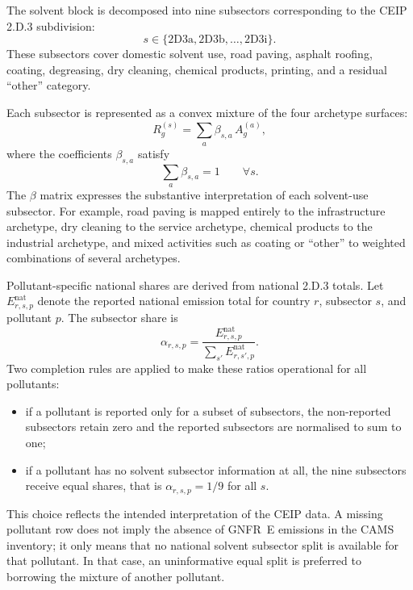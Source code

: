 The solvent block is decomposed into nine subsectors corresponding to
the CEIP 2.D.3 subdivision:
\begin{equation}
  s \in \{
  \mathrm{2D3a},\mathrm{2D3b},\ldots,\mathrm{2D3i}
  \}.
\end{equation}
These subsectors cover domestic solvent use, road paving, asphalt
roofing, coating, degreasing, dry cleaning, chemical products,
printing, and a residual ``other'' category.

Each subsector is represented as a convex mixture of the four archetype
surfaces:
\begin{equation}
  R_g^{(s)} =
  \sum_{a}
  \beta_{s,a} \, A_g^{(a)},
\end{equation}
where the coefficients $\beta_{s,a}$ satisfy
\begin{equation}
  \sum_a \beta_{s,a} = 1
  \qquad \forall s.
\end{equation}
The $\beta$ matrix expresses the substantive interpretation of each
solvent-use subsector. For example, road paving is mapped entirely to
the infrastructure archetype, dry cleaning to the service archetype,
chemical products to the industrial archetype, and mixed activities such
as coating or ``other'' to weighted combinations of several archetypes.

Pollutant-specific national shares are derived from national 2.D.3
totals. Let $E_{r,s,p}^{\mathrm{nat}}$ denote the reported national
emission total for country $r$, subsector $s$, and pollutant $p$. The
subsector share is
\begin{equation}
  \alpha_{r,s,p} =
  \frac{E_{r,s,p}^{\mathrm{nat}}}
       {\displaystyle\sum_{s'} E_{r,s',p}^{\mathrm{nat}}}.
  \label{eq:solvents-alpha}
\end{equation}
Two completion rules are applied to make these ratios operational for
all pollutants:
\begin{itemize}
  \item if a pollutant is reported only for a subset of subsectors, the
        non-reported subsectors retain zero and the reported subsectors
        are normalised to sum to one;
  \item if a pollutant has no solvent subsector information at all, the
        nine subsectors receive equal shares, that is
        $\alpha_{r,s,p}=1/9$ for all $s$.
\end{itemize}

This choice reflects the intended interpretation of the CEIP data. A
missing pollutant row does not imply the absence of GNFR~E emissions in
the CAMS inventory; it only means that no national solvent subsector
split is available for that pollutant. In that case, an uninformative
equal split is preferred to borrowing the mixture of another pollutant.

